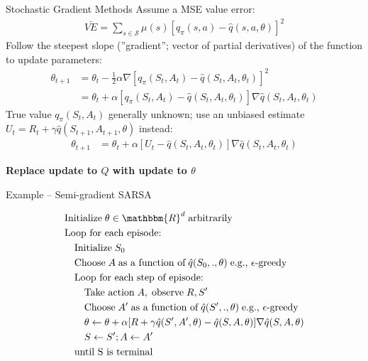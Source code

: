 \documentclass[ignorenonframetext,xcolor=x11names]{beamer}
\begin{document}
\begin{frame}{Stochastic Gradient Methods}
Assume a MSE value error:
\begin{align*}
\bar{VE} = \sum_{s \in \mathcal{S}} \mu(s) \left[ q_\pi(s, a) - \hat{q}(s, a, \theta) \right]^2
\end{align*}
Follow the steepest slope (''gradient''; vector of partial derivatives) of the function to update parameters:
\begin{align*}
\theta_{t+1} &= \theta_t - \frac{1}{2} \alpha \nabla \left[ q_\pi(S_t, A_t) - \hat{q}(S_t, A_t,  \theta_t)\right]^2 \\
 &= \theta_t + \alpha \left[ q_\pi(S_t, A_t) - \hat{q}(S_t, A_t, \theta_t)\right] \nabla \hat{q}(S_t, A_t, \theta_t)
\end{align*}
True value $q_\pi(S_t, A_t)$ generally unknown; use an unbiased estimate $U_t = R_t + \gamma \hat{q}(S_{t+1}, A_{t+1}, \theta)$ instead:
\begin{align*}
\theta_{t+1} &= \theta_t + \alpha \left[ U_t - \hat{q}(S_t, A_t, \theta_t)\right] \nabla \hat{q}(S_t, A_t, \theta_t)
\end{align*}
\vspace{-\baselineskip}
\begin{block}{}
\textbf{Replace update to $Q$ with update to $\theta$}
\end{block}
\end{frame}

\begin{frame}{Example -- Semi-gradient SARSA}
\begin{block}{}
\begin{align*}
& \text{Initialize}\; \theta \in \mathbbm{R}^d \; \text{arbitrarily} \\
& \text{Loop for each episode:} \\
& \quad \text{Initialize}\; S_0 \\
& \quad \text{Choose}\; A \; \text{as a function of}\; \hat{q}(S_0, ., \theta) \; \text{e.g., $\epsilon$-greedy} \\ 
& \quad \text{Loop for each step of episode:} \\
& \quad \quad \text{Take action}\; A, \; \text{observe} \; R, S' \\
& \quad \quad \text{Choose}\; A' \; \text{as a function of}\; \hat{q}(S', ., \theta) \; \text{e.g., $\epsilon$-greedy} \\ 
& \quad \quad \theta \leftarrow \theta + \alpha [R + \gamma \hat{q}(S', A', \theta) - \hat{q}(S, A, \theta)] \nabla \hat{q}(S, A, \theta) \\
& \quad \quad S \leftarrow S'; A \leftarrow A' \\
& \quad \text{until S is terminal}
\end{align*}
\vspace{-\baselineskip}
\end{block}
\end{frame}
\end{document}
